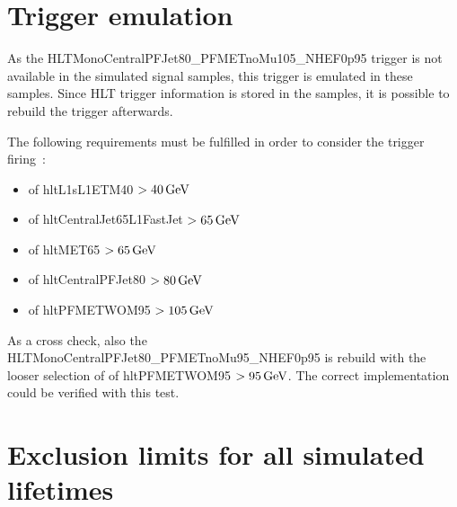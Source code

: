 \clearpage
\section{Trigger emulation}
\label{app:TriggerEmulation}

As the HLTMonoCentralPFJet80\_PFMETnoMu105\_NHEF0p95 trigger is not available in the simulated signal samples, this trigger is emulated in these samples.
Since HLT trigger information is stored in the samples, it is possible to rebuild the trigger afterwards. 

The following requirements must be fulfilled in order to consider the trigger firing~\cite{bib:CMS:DT_Thesis,bib:CMS:DT_8TeV_AN}:
\begin{itemize}
\item \pt of hltL1sL1ETM40 $>40\,\text{Ge}\kern-0.06667em\text{V}$
\item \pt of hltCentralJet65L1FastJet $>65\,\text{Ge}\kern-0.06667em\text{V}$
\item \pt of hltMET65 $>65\,\text{Ge}\kern-0.06667em\text{V}$
\item \pt of hltCentralPFJet80 $>80\,\text{Ge}\kern-0.06667em\text{V}$
\item \pt of hltPFMETWOM95 $>105\,\text{Ge}\kern-0.06667em\text{V}$
\end{itemize}
As a cross check, also the HLTMonoCentralPFJet80\_PFMETnoMu95\_NHEF0p95 is rebuild with the looser selection of \pt of hltPFMETWOM95 $>95\,\text{Ge}\kern-0.06667em\text{V}$.
The correct implementation could be verified with this test.

\clearpage
\section{Exclusion limits for all simulated lifetimes}
\label{app:ExlusionLimits}

